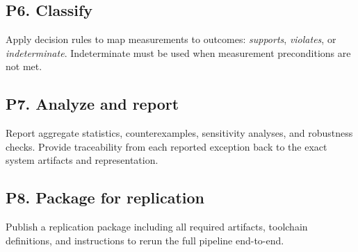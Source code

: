 \subsection*{P6. Classify}
Apply decision rules to map measurements to outcomes: \textit{supports}, \textit{violates}, or \textit{indeterminate}. Indeterminate must be used when measurement preconditions are not met.

\subsection*{P7. Analyze and report}
Report aggregate statistics, counterexamples, sensitivity analyses, and robustness checks. Provide traceability from each reported exception back to the exact system artifacts and representation.

\subsection*{P8. Package for replication}
Publish a replication package including all required artifacts, toolchain definitions, and instructions to rerun the full pipeline end-to-end.